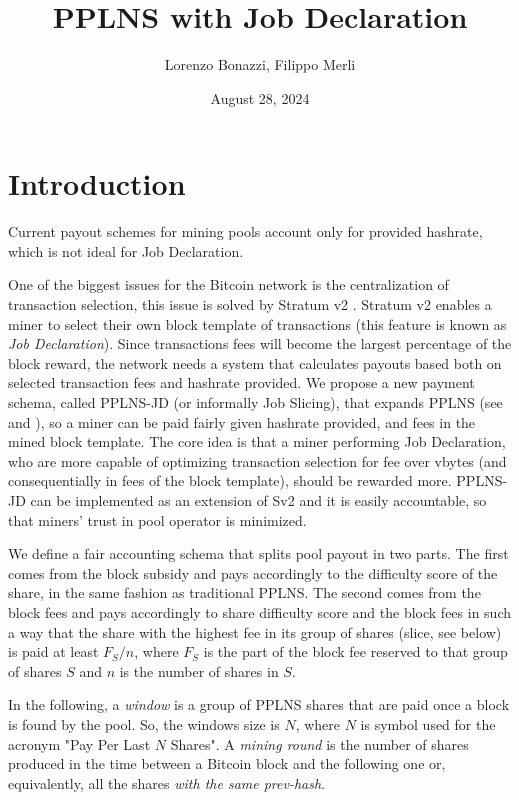 \documentclass[11pt]{article}
\title{PPLNS with Job Declaration}
\author{Lorenzo Bonazzi, Filippo Merli}
\date{August 28, 2024} %
\begin{document}
\maketitle

\section{Introduction}

Current payout schemes for mining pools account only for provided hashrate, which is not ideal for Job Declaration.

One of the biggest issues for the Bitcoin network is the centralization of transaction selection, this issue is solved by Stratum v2 \cite{sv2}. Stratum v2 enables a miner to select their own block template of transactions (this feature is known as \emph{Job Declaration}). Since transactions fees will become the largest percentage of the block reward, the network needs a system that calculates payouts based both on selected transaction fees and hashrate provided. We propose a new payment schema, called PPLNS-JD (or informally Job Slicing), that expands PPLNS (see \cite{rosenfeld} and \cite{ocean}), so a miner can be paid fairly given hashrate provided, and fees in the mined block template. The core idea is that a miner performing Job Declaration, who are more capable of optimizing transaction selection for fee over vbytes (and consequentially in fees of the block template), should be rewarded more. PPLNS-JD can be implemented as an extension of Sv2 \cite{extension} and it is easily accountable, so that miners' trust in pool operator is minimized.

We define a fair accounting schema that splits pool payout in two parts. The first comes from the block subsidy and pays accordingly to the difficulty score of the share, in the same fashion as traditional PPLNS. The second comes from the block fees and pays accordingly to share difficulty score and the block fees in such a way that the share with the highest fee in its group of shares (slice, see below) is paid at least $F_S/n$, where $F_S$ is the part of the block fee reserved to that group of shares $S$ and $n$ is the number of shares in $S$.

In the following, a \emph{window} is a group of PPLNS shares that are paid once a block is found by the pool. So, the windows size is $N$, where $N$ is symbol used for the acronym "Pay Per Last $N$ Shares". A \emph{mining round} is the number of shares produced in the time between a Bitcoin block and the following one or, equivalently, all the shares \emph{with the same prev-hash}.
\end{document}
